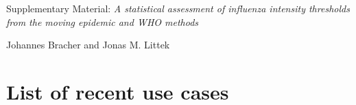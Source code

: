 \documentclass[12pt]{article}
\begin{document}
\appendix


\renewcommand{\thepage}{S\arabic{page}}
\renewcommand{\thesection}{S\arabic{section}}
\renewcommand{\thetable}{S\arabic{table}}
\renewcommand{\thefigure}{S\arabic{figure}}
\setcounter{page}{1}
\setcounter{section}{0}
\setcounter{table}{0}
\setcounter{figure}{0}

\begin{center}
{\LARGE Supplementary Material: \textit{A statistical assessment of influenza intensity thresholds from the moving epidemic and WHO methods}}

\medskip

{\large Johannes Bracher and Jonas M. Littek}
\end{center}

\renewcommand{\thepage}{S\arabic{page}}
\renewcommand{\thesection}{\Alph{section}}
\renewcommand{\thetable}{S\arabic{table}}
\renewcommand\thefigure{S\arabic{figure}}
\renewcommand\theequation{S\arabic{equation}}

\setcounter{figure}{0}
\setcounter{table}{0}
\setcounter{equation}{0}

\newpage

\section{List of recent use cases}
\end{document}
